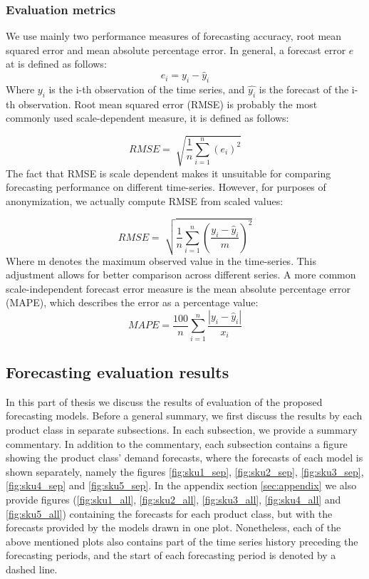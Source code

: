 \documentclass[11pt,a4paper]{article}
\begin{document}
\subsubsection{Evaluation metrics}
We use mainly two performance measures of forecasting accuracy, root mean squared error and mean absolute percentage error. In general, a forecast error $e$ at is defined as follows:
\begin{equation}
e_i = y_i - \hat{y}_i
\end{equation}
Where $y_i$ is the i-th observation of the time series, and $\hat{y_i}$ is the forecast of the i-th observation.
Root mean squared error (RMSE) is probably the most commonly used scale-dependent measure, it is defined as follows:

\begin{equation}
RMSE = \sqrt[]{\frac{1}{n} \sum\limits_{i=1}^n (e_i)^2 }\end{equation}
The fact that RMSE is scale dependent makes it unsuitable for comparing forecasting performance on different time-series. However, for purposes of anonymization, we actually compute RMSE from scaled values:

\begin{equation}
RMSE = \sqrt[]{\frac{1}{n} \sum\limits_{i=1}^n (\frac{y_i- \hat{y}_i}{m} )^2 }\end{equation}
Where m denotes the maximum observed value in the time-series. This adjustment allows for better comparison across different series. A more common scale-independent forecast error measure is the mean absolute percentage error (MAPE), which describes the error as a percentage value:
\begin{equation}
MAPE = \frac{100}{n} \sum\limits_{i=1}^n \frac{| y_i - \hat{y}_i |}{x_i}
\end{equation}

\subsection{Forecasting evaluation results}
In this part of thesis we discuss the results of evaluation of the proposed forecasting models. Before a general summary, we first discuss the results by each product class in separate subsections.
In each subsection, we provide a summary commentary. In addition to the commentary, each subsection contains a figure showing the product class' demand forecasts, where the forecasts of each model is shown separately, namely the figures \ref{fig:sku1_sep}, \ref{fig:sku2_sep}, \ref{fig:sku3_sep}, \ref{fig:sku4_sep} and \ref{fig:sku5_sep}. In the appendix section \ref{sec:appendix} we also provide figures (\ref{fig:sku1_all}, \ref{fig:sku2_all}, \ref{fig:sku3_all}, \ref{fig:sku4_all} and \ref{fig:sku5_all}) containing the forecasts for each product class, but with the forecasts provided by the models drawn in one plot.
Nonetheless, each of the above mentioned plots also contains part of the time series history preceding the forecasting periods, and the start of each forecasting period is denoted by a dashed line.
\end{document}
